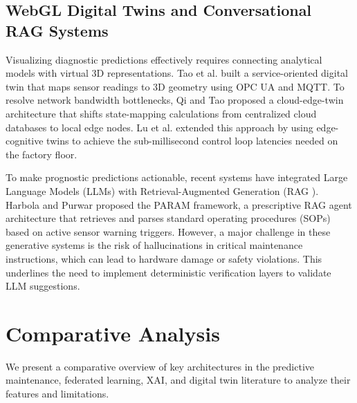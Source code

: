 \documentclass[journal,10pt,compsoc]{IEEEtran}
\begin{document}
\subsection{WebGL Digital Twins and Conversational RAG Systems}
Visualizing diagnostic predictions effectively requires connecting analytical models with virtual 3D representations. Tao et al. \cite{tao_dt} built a service-oriented digital twin that maps sensor readings to 3D geometry using OPC UA \cite{bila_opcua} and MQTT. To resolve network bandwidth bottlenecks, Qi and Tao \cite{qi_dt_factory} proposed a cloud-edge-twin architecture that shifts state-mapping calculations from centralized cloud databases to local edge nodes. Lu et al. \cite{lu_edge_dt} extended this approach by using edge-cognitive twins to achieve the sub-millisecond control loop latencies needed on the factory floor.

To make prognostic predictions actionable, recent systems have integrated Large Language Models (LLMs) with Retrieval-Augmented Generation (RAG \cite{lewis_rag}). Harbola and Purwar \cite{harbola_param} proposed the PARAM framework, a prescriptive RAG agent architecture that retrieves and parses standard operating procedures (SOPs) based on active sensor warning triggers. However, a major challenge in these generative systems is the risk of hallucinations in critical maintenance instructions, which can lead to hardware damage or safety violations. This underlines the need to implement deterministic verification layers to validate LLM suggestions.

\section{Comparative Analysis}
\label{sec:comparative}

We present a comparative overview of key architectures in the predictive maintenance, federated learning, XAI, and digital twin literature to analyze their features and limitations.
\end{document}
